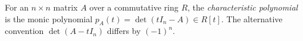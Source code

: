 
For an $n\times n$ matrix $A$ over a commutative ring $R$, the \emph{characteristic polynomial} is the monic polynomial $p_A(t)=\det(tI_n-A)\in R[t]$. The alternative convention $\det(A-tI_n)$ differs by $(-1)^n$.
